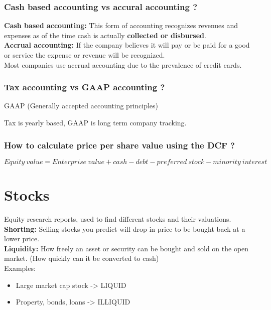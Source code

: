 \documentclass[11pt]{scrartcl} %
\begin{document}
\subsubsection{Cash based accounting vs accural accounting ?}

\textbf{Cash based accounting:} This form of accounting recognizes revenues and expenses as of the time cash is actually \textbf{collected or disbursed}.\\

\textbf{Accrual accounting:} If the company believes it will pay or be paid for a good or service the expense or revenue will be recognized. \\

Most companies use accrual accounting due to the prevalence of credit cards.

\subsubsection{Tax accounting vs GAAP accounting ?}

GAAP (Generally accepted accounting principles)

Tax is yearly based, GAAP is long term company tracking.

\subsubsection{How to calculate price per share value using the DCF ?}

\[ Equity\:value = Enterprise\:value + cash - debt - preferred\:stock - minority\:interest \]

\section{Stocks}

Equity research reports, used to find different stocks and their valuations.\\

\textbf{Shorting:} Selling stocks you predict will drop in price to be bought back at a lower price.\\

\textbf{Liquidity:} How freely an asset or security can be bought and sold on the open market. (How quickly can it be converted to cash)\\

Examples:
\begin{itemize}
	\item Large market cap stock -> LIQUID
	\item Property, bonds, loans -> ILLIQUID
\end{itemize}
\end{document}
